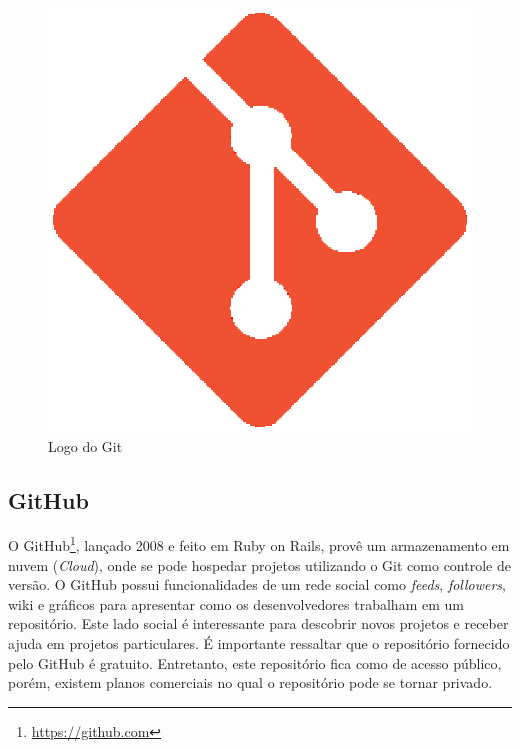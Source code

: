 \begin{figure}[!h]
	\centering
	\includegraphics[scale=0.35]{figuras/capitulo3/git.eps}
	\caption{Logo do Git}
	\label{git}
\end{figure}

\subsection{GitHub}

O GitHub\footnote{\url{https://github.com}}, lançado 2008 e feito em Ruby on Rails, provê um armazenamento em nuvem (\textit{Cloud}), onde se pode hospedar projetos utilizando o Git como controle de versão. O GitHub possui funcionalidades de um rede social como \textit{feeds}, \textit{followers}, wiki e gráficos para apresentar como os desenvolvedores trabalham em um repositório. Este lado social é interessante para descobrir novos projetos e receber ajuda em projetos particulares. É importante ressaltar que o repositório fornecido pelo GitHub é gratuito. Entretanto, este repositório fica como de acesso público, porém, existem planos comerciais no qual o repositório pode se tornar privado.

